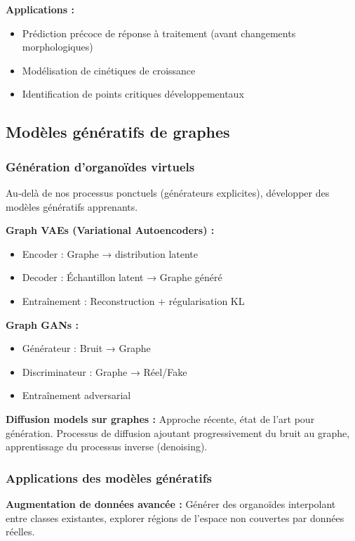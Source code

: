 \textbf{Applications :}
\begin{itemize}
    \item Prédiction précoce de réponse à traitement (avant changements morphologiques)
    \item Modélisation de cinétiques de croissance
    \item Identification de points critiques développementaux
\end{itemize}

\subsection{Modèles génératifs de graphes}

\subsubsection{Génération d'organoïdes virtuels}

Au-delà de nos processus ponctuels (générateurs explicites), développer des modèles génératifs apprenants.

\textbf{Graph VAEs (Variational Autoencoders) :}
\begin{itemize}
    \item Encoder : Graphe → distribution latente
    \item Decoder : Échantillon latent → Graphe généré
    \item Entraînement : Reconstruction + régularisation KL
\end{itemize}

\textbf{Graph GANs :}
\begin{itemize}
    \item Générateur : Bruit → Graphe
    \item Discriminateur : Graphe → Réel/Fake
    \item Entraînement adversarial
\end{itemize}

\textbf{Diffusion models sur graphes :}
Approche récente, état de l'art pour génération. Processus de diffusion ajoutant progressivement du bruit au graphe, apprentissage du processus inverse (denoising).

\subsubsection{Applications des modèles génératifs}

\textbf{Augmentation de données avancée :}
Générer des organoïdes interpolant entre classes existantes, explorer régions de l'espace non couvertes par données réelles.

